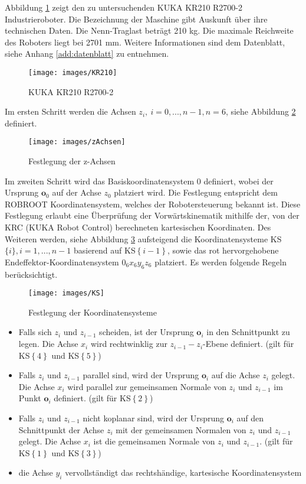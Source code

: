 Abbildung \ref{fig:kr210} zeigt den zu untersuchenden KUKA KR210 R2700-2 Industrieroboter. Die Bezeichnung der Maschine gibt Auskunft über ihre technischen Daten.  Die Nenn-Traglast beträgt 210 kg. Die maximale Reichweite des Roboters liegt bei 2701 mm. Weitere Informationen sind dem Datenblatt, siehe Anhang \ref{add:datenblatt} zu entnehmen.  
%
\begin{figure}[tbph]
	\centering
	\texttt{[image: images/KR210]}
	\caption{KUKA KR210 R2700-2}
	\label{fig:kr210}
\end{figure}
%
Im ersten Schritt werden die Achsen $z_i, \ i = 0,...,n-1, n=6$,	siehe Abbildung \ref{fig:zachsen} definiert. 
%
\begin{figure}[tbph]
	\centering
	\texttt{[image: images/zAchsen]}
	\caption[]{Festlegung der z-Achsen}
	\label{fig:zachsen}
\end{figure}
%
Im zweiten Schritt wird das Basiskoordinatensystem ${0}$ definiert, wobei der Ursprung $\bm{o}_0$ auf der Achse $z_0$ platziert wird. Die Festlegung entspricht dem ROBROOT Koordinatensystem, welches der Robotersteuerung bekannt ist. Diese Festlegung erlaubt eine Überprüfung der Vorwärtskinematik mithilfe der, von der KRC (KUKA Robot Control) berechneten kartesischen Koordinaten. Des Weiteren werden, siehe Abbildung \ref{fig:KS} aufsteigend die Koordinatensysteme KS$\{i\},i=1,...,n-1$ basierend auf KS$\left\{i-1\right\}$, sowie das rot hervorgehobene Endeffektor-Koordinatensystem $0_6x_6y_6z_6$ platziert. Es werden folgende Regeln berücksichtigt.  
%
\begin{figure}[tbph]
	\centering
	\texttt{[image: images/KS]}
	\caption{Festlegung der Koordinatensysteme}
	\label{fig:KS}
\end{figure}
%
\begin{itemize}
	\item Falls sich $z_i$ und $z_{i-1}$ scheiden, ist der Ursprung $\bm{o}_i$ in den Schnittpunkt zu legen. Die Achse $x_i$ wird rechtwinklig zur $z_{i-1}-z_i$-Ebene definiert. (gilt für KS$\left\{4\right\}$ und KS$\left\{5\right\}$)
	\item Falls  $z_i$ und $z_{i-1}$ parallel sind, wird der Ursprung $\bm{o}_i$ auf die Achse $z_i$ gelegt. Die Achse $x_i$ wird parallel zur gemeinsamen Normale von $z_i$ und $z_{i-1}$	im Punkt $\bm{o}_i$ definiert. (gilt für KS$\left\{2\right\}$)
	\item Falls  $z_i$ und $z_{i-1}$ nicht koplanar sind, wird der Ursprung $\bm{o}_i$ auf den Schnittpunkt der Achse $z_i$ mit der gemeinsamen Normalen von $z_i$ und $z_{i-1}$  gelegt. Die Achse $x_i$ ist die gemeinsamen Normale von $z_i$ und $z_{i-1}$. (gilt für KS$\left\{1\right\}$ und KS$\left\{3\right\}$)
	\item die Achse $y_i$ vervollständigt das rechtshändige, kartesische Koordinatensystem
\end{itemize} 

